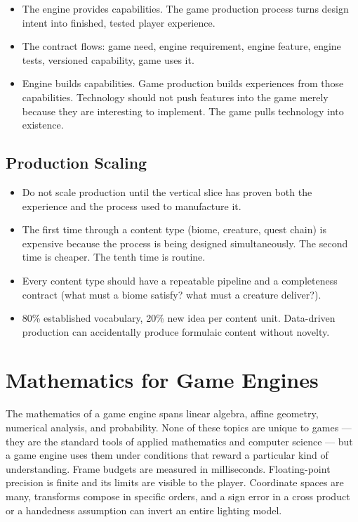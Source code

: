 \documentclass[
  11pt,
  letterpaper,
  DIV=11,
  numbers=noendperiod,
  twoside,
  open=right]{scrreprt}
\providecommand{\tightlist}{%
  \setlength{\itemsep}{0pt}\setlength{\parskip}{0pt}}
\begin{document}
\begin{itemize}
\tightlist
\item
  The engine provides capabilities. The game production process turns
  design intent into finished, tested player experience.
\item
  The contract flows: game need, engine requirement, engine feature,
  engine tests, versioned capability, game uses it.
\item
  Engine builds capabilities. Game production builds experiences from
  those capabilities. Technology should not push features into the game
  merely because they are interesting to implement. The game pulls
  technology into existence.
\end{itemize}

\section{Production Scaling}\label{production-scaling}

\begin{itemize}
\tightlist
\item
  Do not scale production until the vertical slice has proven both the
  experience and the process used to manufacture it.
\item
  The first time through a content type (biome, creature, quest chain)
  is expensive because the process is being designed simultaneously. The
  second time is cheaper. The tenth time is routine.
\item
  Every content type should have a repeatable pipeline and a
  completeness contract (what must a biome satisfy? what must a creature
  deliver?).
\item
  80\% established vocabulary, 20\% new idea per content unit.
  Data-driven production can accidentally produce formulaic content
  without novelty.
\end{itemize}

\cleardoublepage
{}
{}
\appendix

\chapter{Mathematics for Game
Engines}\label{mathematics-for-game-engines}

The mathematics of a game engine spans linear algebra, affine geometry,
numerical analysis, and probability. None of these topics are unique to
games --- they are the standard tools of applied mathematics and
computer science --- but a game engine uses them under conditions that
reward a particular kind of understanding. Frame budgets are measured in
milliseconds. Floating-point precision is finite and its limits are
visible to the player. Coordinate spaces are many, transforms compose in
specific orders, and a sign error in a cross product or a handedness
assumption can invert an entire lighting model.
\end{document}
